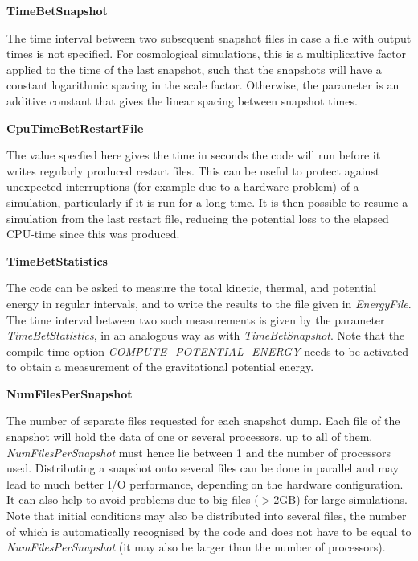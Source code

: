 \begin{DoxyItemize}
\item {\bfseries TimeBetSnapshot} \par
 The time interval between two subsequent snapshot files in case a file with output times is not specified. For cosmological simulations, this is a multiplicative factor applied to the time of the last snapshot, such that the snapshots will have a constant logarithmic spacing in the scale factor. Otherwise, the parameter is an additive constant that gives the linear spacing between snapshot times.
\end{DoxyItemize}


\begin{DoxyItemize}
\item {\bfseries CpuTimeBetRestartFile} \par
 The value specfied here gives the time in seconds the code will run before it writes regularly produced restart files. This can be useful to protect against unexpected interruptions (for example due to a hardware problem) of a simulation, particularly if it is run for a long time. It is then possible to resume a simulation from the last restart file, reducing the potential loss to the elapsed CPU-\/time since this was produced.
\end{DoxyItemize}


\begin{DoxyItemize}
\item {\bfseries TimeBetStatistics} \par
 The code can be asked to measure the total kinetic, thermal, and potential energy in regular intervals, and to write the results to the file given in {\itshape EnergyFile\/}. The time interval between two such measurements is given by the parameter {\itshape TimeBetStatistics\/}, in an analogous way as with {\itshape TimeBetSnapshot\/}. Note that the compile time option {\itshape COMPUTE\_\-POTENTIAL\_\-ENERGY\/} needs to be activated to obtain a measurement of the gravitational potential energy.
\end{DoxyItemize}


\begin{DoxyItemize}
\item {\bfseries NumFilesPerSnapshot} \par
 The number of separate files requested for each snapshot dump. Each file of the snapshot will hold the data of one or several processors, up to all of them. {\itshape NumFilesPerSnapshot\/} must hence lie between 1 and the number of processors used. Distributing a snapshot onto several files can be done in parallel and may lead to much better I/O performance, depending on the hardware configuration. It can also help to avoid problems due to big files ($>$2GB) for large simulations. Note that initial conditions may also be distributed into several files, the number of which is automatically recognised by the code and does not have to be equal to {\itshape NumFilesPerSnapshot\/} (it may also be larger than the number of processors).
\end{DoxyItemize}



